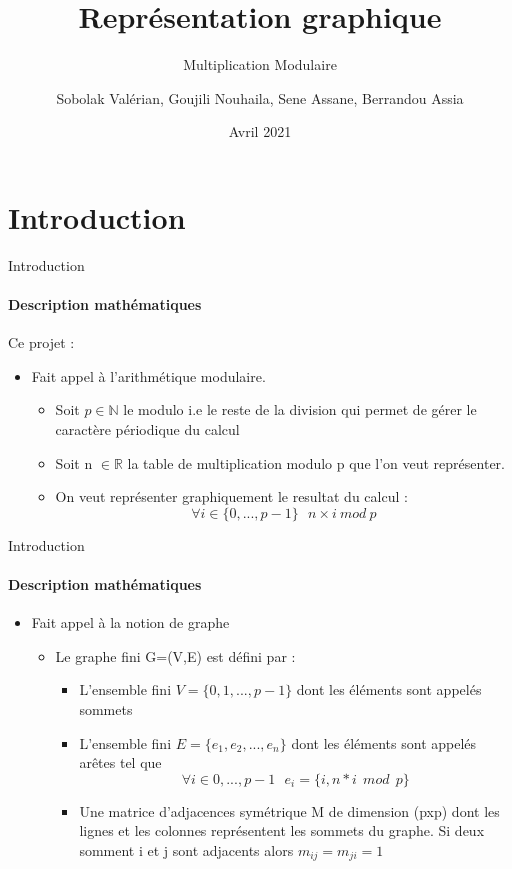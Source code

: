 \documentclass{beamer}
\title[Multiplication Modulaire] 
{Représentation graphique}
\subtitle{Multiplication Modulaire}
\author{Sobolak Valérian, Goujili Nouhaila, Sene Assane, Berrandou Assia}
{Master MIND/BIOSTAT}
\institute[VFU] %
{Université de Montpellier}
\date[Avril 2021] %
{Avril 2021}
\begin{document}
\frame{\titlepage}

\section{Introduction}
\begin{frame}{Introduction}
\framesubtitle{Description mathématiques}
Ce projet : 
\begin{itemize}
\item Fait appel à l'arithmétique modulaire. 
\begin{itemize}
\item Soit $p\in \mathbb{N}$ le modulo i.e le reste de la division qui permet de gérer le caractère périodique du calcul
\item Soit n $\in \mathbb{R}$ la table de multiplication modulo p que l'on veut représenter.
\item On veut représenter graphiquement le resultat du calcul : $$\forall i \in \{0, ..., p-1\}\ \ \   n \times i \  mod  \ p$$
\end{itemize}
\end{itemize}

\end{frame}

\begin{frame}{Introduction}
\framesubtitle{Description mathématiques}
\begin{itemize}
\item Fait appel à la notion de graphe
\begin{itemize} 
\item Le graphe fini G=(V,E) est défini par :
\begin{itemize}
\item L’ensemble fini $V=\{0,1,...,p-1\}$ dont les éléments sont appelés sommets
\item L’ensemble fini $E=\{e_1,e_2,...,e_n\}$ dont les éléments sont appelés arêtes tel que $$\forall i \in {0,..., p-1} \ \ \  e_i = \{i, n * i \ \ mod \ \ p\}$$
\item  Une matrice d’adjacences symétrique M de dimension (pxp) dont les lignes et les colonnes représentent les sommets du graphe.
Si deux somment i et j sont adjacents alors $m_{ij}=m_{ji}=1$ 
\end{itemize}
\end{itemize}
\end{itemize}
\end{frame}
\end{document}
